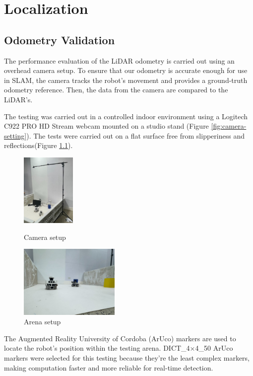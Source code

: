 \chapter{Localization}

\section*{Odometry Validation}
\quad The performance evaluation of the LiDAR odometry is carried out using an overhead camera setup. To ensure that our odometry is accurate enough for use in SLAM, the camera tracks the robot’s movement and provides a ground-truth odometry reference. Then, the data from the camera are compared to the LiDAR's.

The testing was carried out in a controlled indoor environment using a Logitech C922 PRO HD Stream webcam mounted on a studio stand (Figure \ref{fig:camera-setting}). The tests were carried out on a flat surface free from slipperiness and reflections(Figure \ref{fig:arena-setting}). 
\begin{figure}[!htb]
    \centering
    \begin{minipage}{0.48\textwidth}
        \centering
        \includegraphics[height=3.5cm]{assets/images/odometry/cam_setting.jpg}
        \caption{Camera setup}
        \label{fig:camera-setting}
    \end{minipage}\hfill
    \begin{minipage}{0.48\textwidth}
        \centering
        \includegraphics[height=3.5cm]{assets/images/odometry/arena_setting.jpg}
        \caption{Arena setup}
        \label{fig:arena-setting}
    \end{minipage}
\end{figure}

The Augmented Reality University of Cordoba (ArUco) markers are used to locate the robot's position within the testing arena. DICT\_4×4\_50 ArUco markers were selected for this testing because they're the least complex markers, making computation faster and more reliable for real-time detection. 


